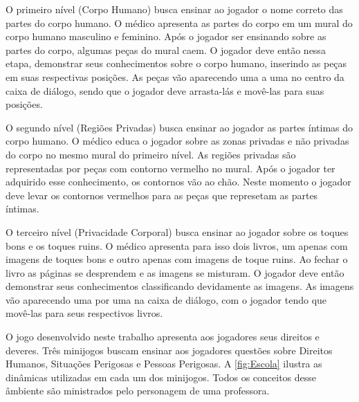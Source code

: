 \begin{figure}
  \vspace{-1.0cm}
\end{figure}

O primeiro nível (Corpo Humano) busca ensinar ao jogador o nome correto das partes do corpo humano. O médico apresenta as partes do corpo em um mural do corpo humano masculino e feminino. Após o jogador ser ensinando sobre as partes do corpo, algumas peças do mural caem. O jogador deve então nessa etapa, demonstrar seus conhecimentos sobre o corpo humano, inserindo as peças em suas respectivas posições. As peças vão aparecendo uma a uma no centro da caixa de diálogo, sendo que o jogador deve arrasta-lás e movê-las para suas posições. %


O segundo nível (Regiões Privadas) busca ensinar ao jogador as partes íntimas do corpo humano. O médico educa o jogador sobre as zonas privadas e não privadas do corpo no mesmo mural do primeiro nível. As regiões privadas são representadas por peças com contorno vermelho no mural. Após o jogador ter adquirido esse conhecimento, os contornos vão ao chão. Neste momento o jogador deve levar os contornos vermelhos para as peças que represetam as partes íntimas.

O terceiro nível (Privacidade Corporal) busca ensinar ao jogador sobre os toques bons e os toques ruins. O médico apresenta para isso dois livros, um apenas com imagens de toques bons e outro apenas com imagens de toque ruins. Ao fechar o livro as páginas se desprendem e as imagens se misturam. O jogador deve então demonstrar seus conhecimentos classificando devidamente as imagens. As imagens vão aparecendo uma por uma na caixa de diálogo, com o jogador tendo que movê-las para seus respectivos livros. 

O jogo desenvolvido neste trabalho apresenta aos jogadores seus direitos e deveres. Três minijogos buscam ensinar aos jogadores questões sobre Direitos Humanos, Situações Perigosas e Pessoas Perigosas. A \autoref{fig:Escola} ilustra as dinâmicas utilizadas em cada um dos minijogos. Todos os conceitos desse âmbiente são ministrados pelo personagem de uma professora. 

